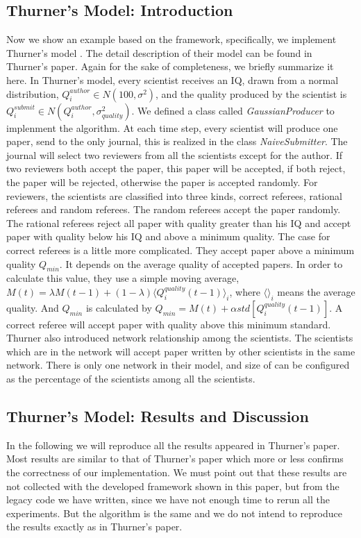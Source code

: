 \documentclass[11pt]{article}
\begin{document}
\subsection{Thurner's Model: Introduction}
Now we show an example based on the framework, specifically, we implement Thurner's model \cite{thurner2010peer}. The detail description of their model can be found in Thurner's paper. Again for the sake of completeness, we briefly summarize it here. In Thurner's model, every scientist receives an IQ, drawn from a normal distribution, $Q_{i}^{author} \in N(100, \sigma^{2})$, and the quality produced by the scientist is $Q_{i}^{submit} \in N(Q_{i}^{author}, \sigma^{2}_{quality})$. We defined a class called \emph{GaussianProducer} to implenment the algorithm. At each time step, every scientist will produce one paper, send to the only journal, this is realized in the class \emph{NaiveSubmitter}. The journal will select two reviewers from all the scientists except for the author. If two reviewers both accept the paper, this paper will be accepted, if both reject, the paper will be rejected, otherwise the paper is accepted randomly. For reviewers, the scientists are classified into three kinds, correct referees, rational referees and random referees. The random referees accept the paper randomly. The rational referees reject all paper with quality greater than his IQ and accept paper with quality below his IQ and above a minimum quality. The case for correct referees is a little more complicated. They accept paper above a minimum quality $Q_{min}$. It depends on the average quality of accepted papers. In order to calculate this value, they use a simple moving average, $M(t) = \lambda M(t-1) + (1 - \lambda) \langle Q_{i}^{quality}(t-1)\rangle_{i}$, where $\langle \rangle _{i}$ means the average quality. And $Q_{min}$ is calculated by $Q_{min} = M(t) + \alpha std[Q_{i}^{quality}(t-1)]$. A correct referee will accept paper with quality above this minimum standard. Thurner also introduced network relationship among the scientists. The scientists which are in the network will accept paper written by other scientists in the same network. There is only one network in their model, and size of can be configured as the percentage of the scientists among all the scientists.

\subsection{Thurner's Model: Results and Discussion}
In the following we will reproduce all the results appeared in Thurner's paper. Most results are similar to that of Thurner's paper which more or less confirms the correctness of our implementation. We must point out that these results are not collected with the developed framework shown in this paper, but from the legacy code we have written, since we have not enough time to rerun all the experiments. But the algorithm is the same and we do not intend to reproduce the results exactly as in Thurner's paper.
\end{document}
